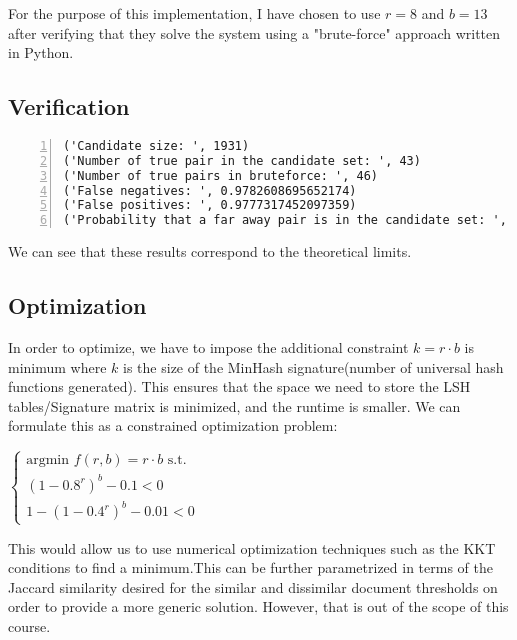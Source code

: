 For the purpose of this implementation, I have chosen to use $r=8$ and $b=13$ after verifying that they solve the system using a  "brute-force" approach written in Python.

\subsection{Verification}
\begin{lstlisting}[language={},numbers=left,numberstyle=\tiny,frame=single,breaklines=true,postbreak=\mbox{\textcolor{red}{$\hookrightarrow$}\space}]
('Candidate size: ', 1931)
('Number of true pair in the candidate set: ', 43)
('Number of true pairs in bruteforce: ', 46)
('False negatives: ', 0.9782608695652174)
('False positives: ', 0.9777317452097359)
('Probability that a far away pair is in the candidate set: ', 0.0008969085829825304)
\end{lstlisting}

We can see that these results correspond to the theoretical limits. 

\subsection{Optimization}
In order to optimize, we have to impose the additional constraint $k=r \cdot b$ is minimum where $k$ is the size of the MinHash signature(number of universal hash functions generated). This ensures that the space we need to store the LSH tables/Signature matrix is minimized, and the runtime is smaller. We can formulate this as a constrained optimization problem:

$\begin{cases}
\text{argmin } f(r,b) = r \cdot b \text{ s.t.}\\
(1-0.8^r)^b - 0.1< 0\\
1 - (1-0.4^r)^b - 0.01 < 0
\end{cases}$

This would allow us to use numerical optimization techniques such as the KKT conditions to find a minimum.This can be further parametrized in terms of the Jaccard similarity desired for the similar and dissimilar document thresholds on order to provide a more generic solution. However, that is out of the scope of this course.

